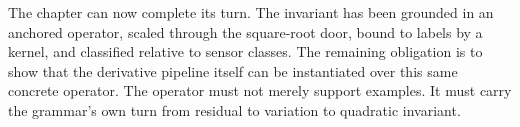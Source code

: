 The chapter can now complete its turn. The invariant has been grounded in an
anchored operator, scaled through the square-root door, bound to labels by a
kernel, and classified relative to sensor classes. The remaining obligation
is to show that the derivative pipeline itself can be instantiated over this
same concrete operator. The operator must not merely support examples. It
must carry the grammar's own turn from residual to variation to quadratic
invariant.
